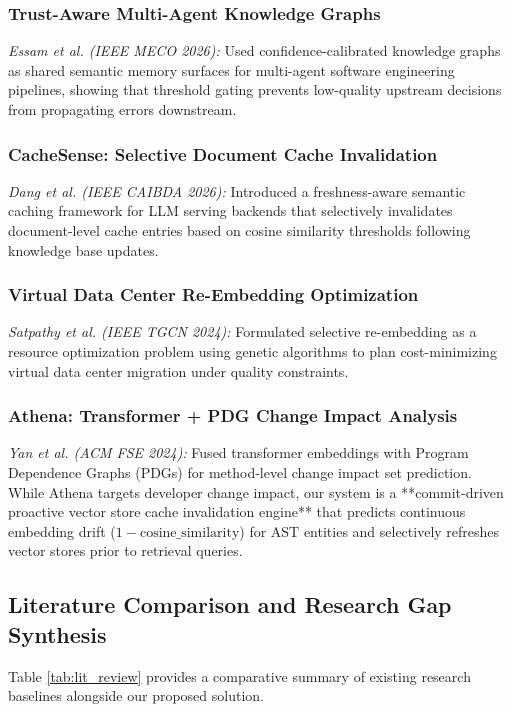 \documentclass[conference]{IEEEtran}
\begin{document}
\subsubsection{Trust-Aware Multi-Agent Knowledge Graphs}
\emph{Essam et al. \cite{Essam2026} (IEEE MECO 2026):} Used confidence-calibrated knowledge graphs as shared semantic memory surfaces for multi-agent software engineering pipelines, showing that threshold gating prevents low-quality upstream decisions from propagating errors downstream.

\subsubsection{CacheSense: Selective Document Cache Invalidation}
\emph{Dang et al. \cite{Dang2026} (IEEE CAIBDA 2026):} Introduced a freshness-aware semantic caching framework for LLM serving backends that selectively invalidates document-level cache entries based on cosine similarity thresholds following knowledge base updates.

\subsubsection{Virtual Data Center Re-Embedding Optimization}
\emph{Satpathy et al. \cite{Satpathy2024} (IEEE TGCN 2024):} Formulated selective re-embedding as a resource optimization problem using genetic algorithms to plan cost-minimizing virtual data center migration under quality constraints.

\subsubsection{Athena: Transformer + PDG Change Impact Analysis}
\emph{Yan et al. \cite{yan2024athena} (ACM FSE 2024):} Fused transformer embeddings with Program Dependence Graphs (PDGs) for method-level change impact set prediction. While Athena targets developer change impact, our system is a **commit-driven proactive vector store cache invalidation engine** that predicts continuous embedding drift ($1 - \text{cosine\_similarity}$) for AST entities and selectively refreshes vector stores prior to retrieval queries.

\subsection{Literature Comparison and Research Gap Synthesis}
Table \ref{tab:lit_review} provides a comparative summary of existing research baselines alongside our proposed solution.
\end{document}
